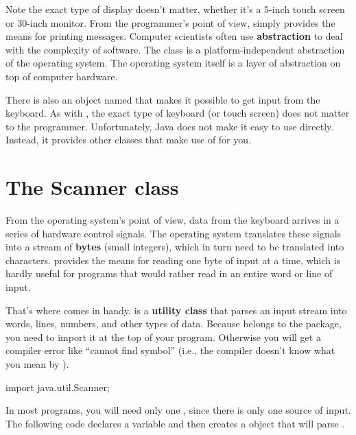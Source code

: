 
Note the exact type of display doesn't matter, whether it's a 5-inch touch screen or 30-inch monitor.
From the programmer's point of view,  simply provides the means for printing messages.
Computer scientists often use {\bf abstraction} to deal with the complexity of software.
The  class is a platform-independent abstraction of the operating system.
The operating system itself is a layer of abstraction on top of computer hardware.

There is also an object named  that makes it possible to get input from the keyboard.
As with , the exact type of keyboard (or touch screen) does not matter to the programmer.
Unfortunately, Java does not make it easy to use  directly.
Instead, it provides other classes that make use of  for you.


\section{The Scanner class}


From the operating system's point of view, data from the keyboard arrives in a series of hardware control signals.
The operating system translates these signals into a stream of {\bf bytes} (small integers), which in turn need to be translated into characters.
 provides the means for reading one byte of input at a time, which is hardly useful for programs that would rather read in an entire word or line of input.


That's where  comes in handy.
 is a {\bf utility class} that parses an input stream into words, lines, numbers, and other types of data.
Because  belongs to the  package, you need to import it at the top of your program.
Otherwise you will get a compiler error like ``cannot find symbol'' (i.e., the compiler doesn't know what you mean by ).

\begin{code}
import java.util.Scanner;
\end{code}

In most programs, you will need only one , since there is only one source of input.
The following code declares a  variable and then creates a  object that will parse .

